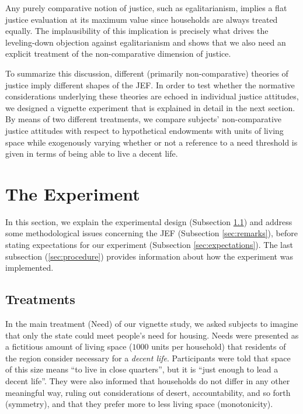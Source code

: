 \documentclass[12pt]{scrartcl}
\begin{document}
Any purely comparative notion of justice, such as egalitarianism, implies a flat justice evaluation at its maximum value since households are always treated equally.
The implausibility of this implication is precisely what drives the leveling-down objection \citep{nozick_anarchy_1974,raz_morality_1986,temkin_inequality_1993} against egalitarianism and shows that we also need an explicit treatment of the non-comparative dimension of justice.

To summarize this discussion, different (primarily non-comparative) theories of justice imply different shapes of the JEF.
In order to test whether the normative considerations underlying these theories are echoed in individual justice attitudes, we designed a vignette experiment that is explained in detail in the next section.
By means of two different treatments, we compare subjects' non-comparative justice attitudes with respect to hypothetical endowments with units of living space while exogenously varying whether or not a reference to a need threshold is given in terms of being able to live a decent life.


\section{The Experiment}\label{sec:experiment}
In this section, we explain the experimental design (Subsection \ref{sec:treatments}) and address some methodological issues concerning the JEF (Subsection \ref{sec:remarks}), before stating expectations for our experiment (Subsection \ref{sec:expectations}).
The last subsection (\ref{sec:procedure}) provides information about how the experiment was implemented.


\subsection{Treatments}\label{sec:treatments}
In the main treatment (Need) of our vignette study, we asked subjects to imagine that only the state could meet people's need for housing.
Needs were presented as a fictitious amount of living space ($1000$ units per household) that residents of the region consider necessary for a \textit{decent life}.
Participants were told that space of this size means ``to live in close quarters'', but it is ``just enough to lead a decent life''.
They were also informed that households do not differ in any other meaningful way, ruling out considerations of desert, accountability, and so forth (symmetry), and that they prefer more to less living space (monotonicity).
\end{document}
